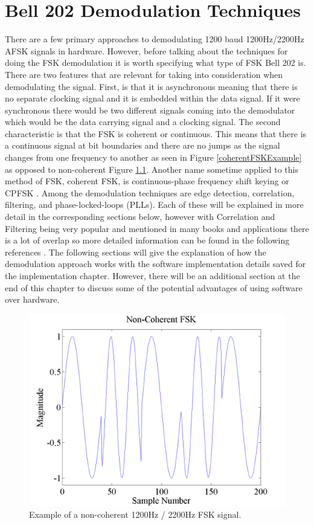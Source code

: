 \chapter{Bell 202 Demodulation Techniques}
There are a few primary approaches to demodulating 1200 baud 1200Hz/2200Hz AFSK signals in hardware.  However, before talking about the techniques for doing the FSK demodulation it is worth specifying what type of FSK Bell 202 is. There are two features that are relevant for taking into consideration when demodulating the signal. First, is that it is asynchronous meaning that there is no separate clocking signal and it is embedded within the data signal. If it were synchronous there would be two different signals coming into the demodulator which would be the data carrying signal and a clocking signal. The second characteristic is that the FSK is coherent or continuous. This means that there is a continuous signal at bit boundaries and there are no jumps as the signal changes from one frequency to another as seen in Figure \ref{coherentFSKExample} as opposed to non-coherent Figure \ref{noncoherentFSKExample}. Another name sometime applied to this method of FSK, coherent FSK, is continuous-phase frequency shift keying or CPFSK \cite{WikipediaCPFSK}. Among the demodulation techniques are edge detection, correlation, filtering, and phase-locked-loops (PLLs). Each of these will be explained in more detail in the corresponding sections below, however with Correlation and Filtering being very popular and mentioned in many books and applications there is a lot of overlap so more detailed information can be found in the following references \cite{MarvinK.Simon1995,Sklar1988,J.Das1986,Proakis1983}. The following sections will give the explanation of how the demodulation approach works with the software implementation details saved for the implementation chapter. However, there will be an additional section at the end of this chapter to discuss some of the potential advantages of using software over hardware.
\begin{figure}
  \centering
	\includegraphics[width=0.75\linewidth]{images/NonCoherentFSK.png} 
	\caption{Example of a non-coherent 1200Hz / 2200Hz FSK signal.}
   \label{noncoherentFSKExample}
\end{figure}
